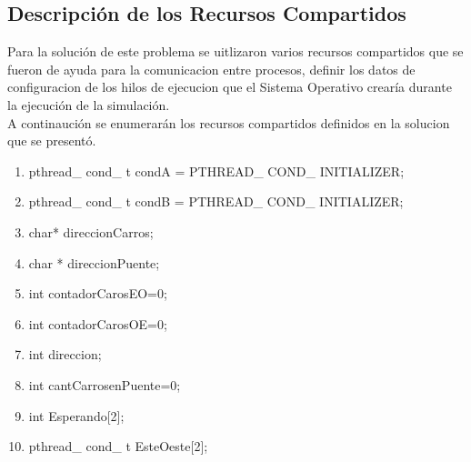 \documentclass[10pt,a4paper]{article}
\begin{document}
\subsection{Descripción de los Recursos Compartidos}
	Para la solución de este problema se uitlizaron varios recursos compartidos que se fueron de ayuda para la comunicacion entre procesos, definir los datos de configuracion de los hilos de ejecucion que el Sistema Operativo crearía durante la ejecución de la simulación.\\
A continaución se enumerarán los recursos compartidos definidos en la solucion que se presentó.\\
\begin{enumerate}
\item  pthread\_ cond\_ t      condA  = PTHREAD\_ COND\_ INITIALIZER; 
\item  pthread\_ cond\_ t      condB  = PTHREAD\_ COND\_ INITIALIZER;
\item char* direccionCarros;
\item char * direccionPuente;
\item int contadorCarosEO=0;
\item int contadorCarosOE=0;
\item int direccion;
\item int cantCarrosenPuente=0;
\item int Esperando[2];
\item pthread\_ cond\_ t EsteOeste[2];
\end{enumerate}
\end{document}
